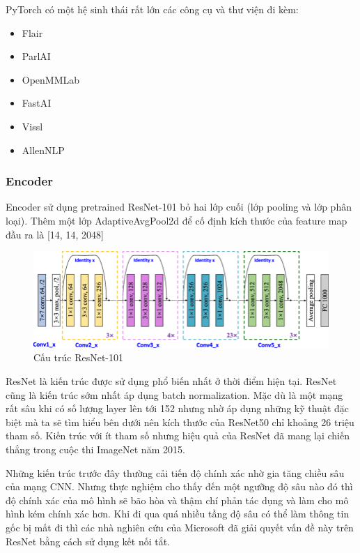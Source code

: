 \documentclass[14pt, a4paper]{article}
\numberwithin{equation}{section}
\numberwithin{algorithm}{section}
\numberwithin{figure}{section}
\numberwithin{table}{section}
\numberwithin{dl}{section}
\numberwithin{md}{section}
\numberwithin{bd}{section}
\numberwithin{dn}{section}
\numberwithin{hq}{section}
\begin{document}
    PyTorch có một hệ sinh thái rất lớn các công cụ và thư viện đi kèm:
    \begin{itemize}
        \item Flair
        \item ParlAI
        \item OpenMMLab
        \item FastAI
        \item Vissl
        \item AllenNLP
    \end{itemize}

    \subsubsection{Encoder}

    Encoder sử dụng pretrained ResNet-101 \cite{he2016deep} bỏ hai lớp cuối (lớp pooling và lớp phân loại).
    Thêm một lớp AdaptiveAvgPool2d để cố định kích thước của feature map đầu ra là [14, 14, 2048]

    \begin{figure}[h!] \centering

        \includegraphics[scale=0.5]{ResNet-101-based-deep-feature-extractor.png}
        \caption{Cấu trúc ResNet-101}
        \label{fig:ResNet-101-based-deep-feature-extractor}

    \end{figure}

    ResNet là kiến trúc được sử dụng phổ biến nhất ở thời điểm hiện tại. 
    ResNet cũng là kiến trúc sớm nhất áp dụng batch normalization. 
    Mặc dù là một mạng rất sâu khi có số lượng layer lên tới 152 nhưng nhờ áp dụng những kỹ thuật đặc biệt mà ta sẽ tìm hiểu bên dưới nên kích thước của ResNet50 chỉ khoảng 26 triệu tham số. 
    Kiến trúc với ít tham số nhưng hiệu quả của ResNet đã mang lại chiến thắng trong cuộc thi ImageNet năm 2015.

    Những kiến trúc trước đây thường cải tiến độ chính xác nhờ gia tăng chiều sâu của mạng CNN. 
    Nhưng thực nghiệm cho thấy đến một ngưỡng độ sâu nào đó thì độ chính xác của mô hình sẽ bão hòa và thậm chí phản tác dụng và làm cho mô hình kém chính xác hơn. 
    Khi đi qua quá nhiều tầng độ sâu có thể làm thông tin gốc bị mất đi thì các nhà nghiên cứu của Microsoft đã giải quyết vấn đề này trên ResNet bằng cách sử dụng kết nối tắt.
\end{document}
